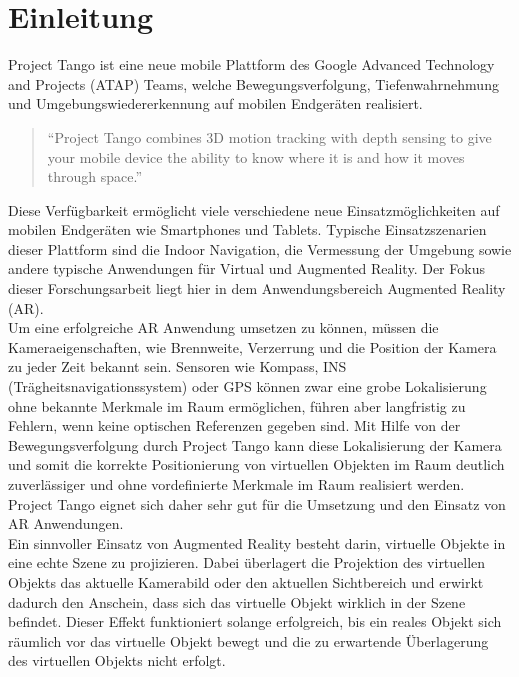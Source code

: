 \chapter{Einleitung}

Project Tango ist eine neue mobile Plattform des Google Advanced Technology and Projects (ATAP) Teams, welche Bewegungsverfolgung, Tiefenwahrnehmung und Umgebungswiedererkennung auf mobilen Endgeräten realisiert.

\begin{quotation}
\enquote{Project Tango combines 3D motion tracking with depth sensing to give your mobile device the ability to know where it is and how it moves through space.}  \citep{Proje19:online}
\end{quotation}

Diese Verfügbarkeit ermöglicht viele verschiedene neue Einsatzmöglichkeiten auf mobilen Endgeräten wie Smartphones und Tablets. Typische Einsatzszenarien dieser Plattform sind die Indoor Navigation, die Vermessung der Umgebung sowie andere typische Anwendungen für Virtual und Augmented Reality. Der Fokus dieser Forschungsarbeit liegt hier in dem Anwendungsbereich Augmented Reality (AR). \\

Um eine erfolgreiche AR Anwendung umsetzen zu können, müssen die Kameraeigenschaften, wie Brennweite, Verzerrung und die Position der Kamera zu jeder Zeit bekannt sein. Sensoren wie Kompass, INS (Trägheitsnavigationssystem) oder GPS können zwar eine grobe Lokalisierung ohne bekannte Merkmale im Raum ermöglichen, führen aber langfristig zu Fehlern, wenn keine optischen Referenzen gegeben sind. Mit Hilfe von der Bewegungsverfolgung durch Project Tango kann diese Lokalisierung der Kamera und somit die korrekte Positionierung von virtuellen Objekten im Raum deutlich zuverlässiger und ohne vordefinierte Merkmale im Raum realisiert werden. Project Tango eignet sich daher sehr gut für die Umsetzung und den Einsatz von AR Anwendungen.\\

Ein sinnvoller Einsatz von Augmented Reality besteht darin, virtuelle Objekte in eine echte Szene zu projizieren. Dabei überlagert die Projektion des virtuellen Objekts das aktuelle Kamerabild oder den aktuellen Sichtbereich und erwirkt dadurch den Anschein, dass sich das virtuelle Objekt wirklich in der Szene befindet. Dieser Effekt funktioniert solange erfolgreich, bis ein reales Objekt sich räumlich vor das virtuelle Objekt bewegt und die zu erwartende Überlagerung des virtuellen Objekts nicht erfolgt. \\

